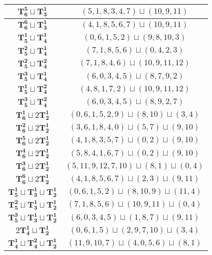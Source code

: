 \documentclass{article}
\begin{document}
\begin{longtable}{|c|c|}
    $\mathbf{T_{6}^{5}} \sqcup \mathbf{T_{3}^{1}}$ & $(5,1,8,3,4,7)\sqcup(10,9,11)$  \\ \hline
    $\mathbf{T_{6}^{6}} \sqcup \mathbf{T_{3}^{1}}$ & $(4,1,8,5,6,7)\sqcup(10,9,11)$  \\ \hline
    $\mathbf{T_{5}^{1}} \sqcup \mathbf{T_{4}^{1}}$ & $(0,6,1,5,2)\sqcup(9,8,10,3)$  \\ \hline
    $\mathbf{T_{5}^{2}} \sqcup \mathbf{T_{4}^{1}}$ & $(7,1,8,5,6)\sqcup(0,4,2,3)$  \\ \hline
    $\mathbf{T_{5}^{2}} \sqcup \mathbf{T_{4}^{2}}$ & $(7,1,8,4,6)\sqcup(10,9,11,12)$  \\ \hline
    $\mathbf{T_{5}^{3}} \sqcup \mathbf{T_{4}^{1}}$ & $(6,0,3,4,5)\sqcup(8,7,9,2)$  \\ \hline
    $\mathbf{T_{5}^{1}} \sqcup \mathbf{T_{4}^{2}}$ & $(4,8,1,7,2)\sqcup(10,9,11,12)$  \\ \hline
    $\mathbf{T_{5}^{3}} \sqcup \mathbf{T_{4}^{2}}$ & $(6,0,3,4,5)\sqcup(8,9,2,7)$  \\ \hline
    $\mathbf{T_{6}^{1}} \sqcup 2\mathbf{T_{2}^{1}}$ & $(0,6,1,5,2,9)\sqcup(8,10)\sqcup(3,4)$  \\ \hline
    $\mathbf{T_{6}^{2}} \sqcup 2\mathbf{T_{2}^{1}}$ & $(3,6,1,8,4,0)\sqcup(5,7)\sqcup(9,10)$  \\ \hline
    $\mathbf{T_{6}^{5}} \sqcup 2\mathbf{T_{2}^{1}}$ & $(4,1,8,3,5,7)\sqcup(0,2)\sqcup(9,10)$  \\ \hline
    $\mathbf{T_{6}^{4}} \sqcup 2\mathbf{T_{2}^{1}}$ & $(5,8,4,1,6,7)\sqcup(0,2)\sqcup(9,10)$  \\ \hline
    $\mathbf{T_{6}^{3}} \sqcup 2\mathbf{T_{2}^{1}}$ & $(5,11,9,12,7,10)\sqcup(8,1)\sqcup(0,4)$  \\ \hline
    $\mathbf{T_{6}^{6}} \sqcup 2\mathbf{T_{2}^{1}}$ & $(4,1,8,5,6,7)\sqcup(2,3)\sqcup(9,11)$  \\ \hline
    $\mathbf{T_{5}^{1}} \sqcup \mathbf{T_{3}^{1}} \sqcup \mathbf{T_{2}^{1}}$ & $(0,6,1,5,2)\sqcup(8,10,9)\sqcup(11,4)$  \\ \hline
    $\mathbf{T_{5}^{2}} \sqcup \mathbf{T_{3}^{1}} \sqcup \mathbf{T_{2}^{1}}$ & $(7,1,8,5,6)\sqcup(10,9,11)\sqcup(0,4)$  \\ \hline
    $\mathbf{T_{5}^{3}} \sqcup \mathbf{T_{3}^{1}} \sqcup \mathbf{T_{2}^{1}}$ & $(6,0,3,4,5)\sqcup(1,8,7)\sqcup(9,11)$  \\ \hline
    $2\mathbf{T_{4}^{1}} \sqcup \mathbf{T_{2}^{1}}$ & $(0,6,1,5)\sqcup(2,9,7,10)\sqcup(3,4)$  \\ \hline
    $\mathbf{T_{4}^{1}} \sqcup \mathbf{T_{4}^{2}} \sqcup \mathbf{T_{2}^{1}}$ & $(11,9,10,7)\sqcup(4,0,5,6)\sqcup(8,1)$  \\ \hline

\end{longtable}
\end{document}
